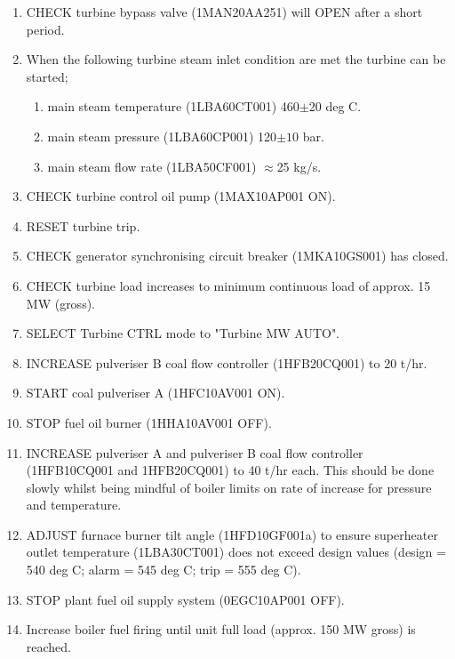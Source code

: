 \documentclass[10pt,a4paper]{article}
\begin{document}
\begin{enumerate}
\item CHECK turbine bypass valve (1MAN20AA251) will OPEN after a short period.
\item When the following turbine steam inlet condition are met the turbine can be started;
\begin{enumerate}
\item main steam temperature (1LBA60CT001) 460$\pm$20 deg C.
\item main steam pressure (1LBA60CP001) 120$\pm10$ bar.
\item main steam flow rate (1LBA50CF001) $\approx$25 kg/s. 
\end{enumerate}
\item CHECK turbine control oil pump (1MAX10AP001 ON).
\item RESET turbine trip.
\item CHECK generator synchronising circuit breaker (1MKA10GS001) has closed.
\item CHECK turbine load increases to minimum continuous load of approx. 15 MW (gross).
\item SELECT Turbine CTRL mode to "Turbine MW AUTO". 
\item INCREASE pulveriser B coal flow controller (1HFB20CQ001) to 20 t/hr.
\item START coal pulveriser A (1HFC10AV001 ON). 
\item STOP fuel oil burner (1HHA10AV001 OFF).
\item INCREASE pulveriser A and pulveriser B coal flow controller (1HFB10CQ001 and 1HFB20CQ001) to 40 t/hr each. This should be done slowly whilst being mindful of boiler limits on rate of increase for pressure and temperature.
\item ADJUST furnace burner tilt angle (1HFD10GF001a) to ensure superheater outlet temperature (1LBA30CT001) does not exceed design values (design = 540 deg C; alarm = 545 deg C; trip = 555 deg C).
\item STOP plant fuel oil supply system (0EGC10AP001 OFF).
\item Increase boiler fuel firing until unit full load (approx. 150 MW gross) is reached.
\end{enumerate}


\vspace*{2cm}
\end{document}
